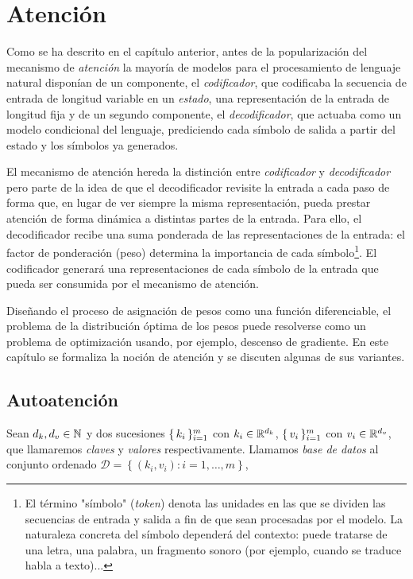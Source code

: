 \chapter{Atención}
Como se ha descrito en el capítulo anterior, antes de la popularización del mecanismo de \textit{atención} la mayoría de modelos para el procesamiento de lenguaje natural disponían de un componente, el \textit{codificador}, que codificaba la secuencia de entrada de longitud variable en un \textit{estado}, una representación de la entrada de longitud fija y de un segundo componente, el \textit{decodificador}, que actuaba como un modelo condicional del lenguaje, prediciendo cada símbolo de salida a partir del estado y los símbolos ya generados.

El mecanismo de atención hereda la distinción entre \textit{codificador} y \textit{decodificador} pero parte de la idea de que el decodificador revisite la entrada a cada paso de forma que, en lugar de ver siempre la misma representación, pueda prestar atención de forma dinámica a distintas partes de la entrada. Para ello, el decodificador recibe una suma ponderada de las representaciones de la entrada: el factor de ponderación (peso) determina la importancia de cada símbolo\footnote{El término "símbolo" (\textit{token}) denota las unidades en las que se dividen las secuencias de entrada y salida a fin de que sean procesadas por el modelo. La naturaleza concreta del símbolo dependerá del contexto: puede tratarse de una letra, una palabra, un fragmento sonoro (por ejemplo, cuando se traduce habla a texto)... }. El codificador generará una representaciones de cada símbolo de la entrada que pueda ser consumida por el mecanismo de atención.

Diseñando el proceso de asignación de pesos como una función diferenciable, el problema de la distribución óptima de los pesos puede resolverse como un problema de optimización usando, por ejemplo, descenso de gradiente. En este capítulo se formaliza la noción de atención y se discuten algunas de sus variantes.

\section{Autoatención}

\begin{definition}
    Sean \( d_k, d_v \in \mathbb{N} \) y dos sucesiones \( \{\, k_i \,\}_{i = 1}^m \) con \( k_i \in \mathbb{R}^{d_k} \), \( \{\,v_i\,\}_{i = 1}^m \) con  \( v_ i \in \mathbb{R}^{d_v} \), que llamaremos \textit{claves} y \textit{valores} respectivamente. Llamamos \textit{base de datos} al conjunto ordenado \( \mathcal{D} = \left\{ (k_i, v_i) \colon i = 1, …, m \right\} \),
\end{definition}

